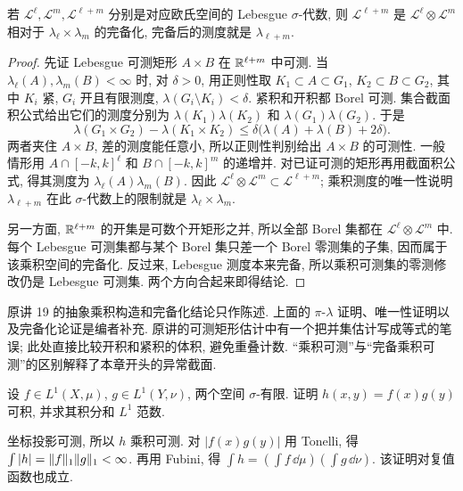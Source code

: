 \begin{theorem}\label{ra:c6:lebesgue-product}
若 $\mathcal L^\ell,\mathcal L^m,\mathcal L^{\ell+m}$ 分别是对应欧氏空间的 Lebesgue $\sigma$-代数, 则 $\mathcal L^{\ell+m}$ 是 $\mathcal L^\ell\otimes\mathcal L^m$ 相对于 $\lambda_\ell\times\lambda_m$ 的完备化, 完备后的测度就是 $\lambda_{\ell+m}$.
\end{theorem}
\begin{proof}
先证 Lebesgue 可测矩形 $A\times B$ 在 $\mathbb R^{\ell+m}$ 中可测. 当 $\lambda_\ell(A),\lambda_m(B)<\infty$ 时, 对 $\delta>0$, 用正则性取 $K_1\subset A\subset G_1$, $K_2\subset B\subset G_2$, 其中 $K_i$ 紧, $G_i$ 开且有限测度, $\lambda(G_i\setminus K_i)<\delta$. 紧积和开积都 Borel 可测. 集合截面积公式给出它们的测度分别为 $\lambda(K_1)\lambda(K_2)$ 和 $\lambda(G_1)\lambda(G_2)$. 于是
\[
 \lambda(G_1\times G_2)-\lambda(K_1\times K_2)
 \le\delta\bigl(\lambda(A)+\lambda(B)+2\delta\bigr).
\]
两者夹住 $A\times B$, 差的测度能任意小, 所以正则性判别给出 $A\times B$ 的可测性. 一般情形用 $A\cap[-k,k]^\ell$ 和 $B\cap[-k,k]^m$ 的递增并. 对已证可测的矩形再用截面积公式, 得其测度为 $\lambda_\ell(A)\lambda_m(B)$. 因此 $\mathcal L^\ell\otimes\mathcal L^m\subset\mathcal L^{\ell+m}$; 乘积测度的唯一性说明 $\lambda_{\ell+m}$ 在此 $\sigma$-代数上的限制就是 $\lambda_\ell\times\lambda_m$.

另一方面, $\mathbb R^{\ell+m}$ 的开集是可数个开矩形之并, 所以全部 Borel 集都在 $\mathcal L^\ell\otimes\mathcal L^m$ 中. 每个 Lebesgue 可测集都与某个 Borel 集只差一个 Borel 零测集的子集, 因而属于该乘积空间的完备化. 反过来, Lebesgue 测度本来完备, 所以乘积可测集的零测修改仍是 Lebesgue 可测集. 两个方向合起来即得结论.
\end{proof}

\begin{remark}
原讲 19 的抽象乘积构造和完备化结论只作陈述. 上面的 $\pi$-$\lambda$ 证明、唯一性证明以及完备化论证是编者补充. 原讲的可测矩形估计中有一个把并集估计写成等式的笔误; 此处直接比较开积和紧积的体积, 避免重叠计数. “乘积可测”与“完备乘积可测”的区别解释了本章开头的异常截面.
\end{remark}


\begin{exercise}
设 $f\in L^1(X,\mu)$, $g\in L^1(Y,\nu)$, 两个空间 $\sigma$-有限. 证明 $h(x,y)=f(x)g(y)$ 可积, 并求其积分和 $L^1$ 范数.
\end{exercise}
\begin{solution}
坐标投影可测, 所以 $h$ 乘积可测. 对 $|f(x)g(y)|$ 用 Tonelli, 得 $\int|h|=\lVert f\rVert_1\lVert g\rVert_1<\infty$. 再用 Fubini, 得 $\int h=(\int f\,\dd\mu)(\int g\,\dd\nu)$. 该证明对复值函数也成立.
\end{solution}

